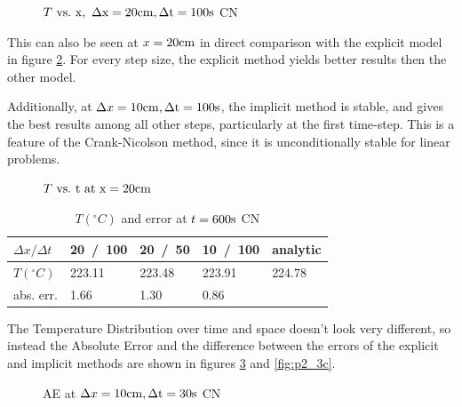 \documentclass[a4paper]{article} %
\begin{document}
\begin{multicols}{2}
\begin{figure}[H]
    
    \caption{$T\ \rm{vs.}\ x,\ \Delta x = 20\rm{cm}, \Delta t = 100\rm{s}$ CN}
    \label{fig:p2_1}
\end{figure}

This can also be seen at $x=20\rm{cm}$ in direct comparison with the explicit model in figure \ref{fig:p2_2}. For every step size, the explicit method yields better results then the other model.

Additionally, at $\Delta x = 10\rm{cm}, \Delta t = 100\rm{s}$, the implicit method is stable, and gives the best results among all other steps, particularly at the first time-step. This is a feature of the Crank-Nicolson method, since it is unconditionally stable for linear problems.


\begin{figure}[H]
    
    \caption{$T\ \rm{vs.}\ t \text{ at } x = 20\rm{cm}$}
    \label{fig:p2_2}
\end{figure}

\begin{table}[H]
\centering
\small
\begin{tabular}{ |p{1.2cm}||p{1.2cm}|p{1.2cm}|p{1.2cm}|p{1.1cm}| }
 \hline
 \rowcolor{gray!50}
 $\Delta x / \Delta t$ & 20\ /\ 100 & 20\ /\ 50 & 10\ /\ 100 & analytic \\
 \hline 
 \cellcolor{gray!25} $T (^\circ C)$ & 223.11 & 223.48 & 223.91 & 224.78 \\
 \hline
 \cellcolor{gray!25} abs. err. & 1.66 & 1.30 & 0.86 & \\
 \hline
\end{tabular}
\caption{$T (^\circ C)$ and error at $t=600\rm{s}$ CN}
\label{table:2}
\end{table}

\columnbreak

The Temperature Distribution over time and space doesn't look very different, so instead the Absolute Error and the difference between the errors of the explicit and implicit methods are shown in figures \ref{fig:p2_3b} and \ref{fig:p2_3c}.    

\begin{figure}[H]
    
    \caption{AE at $\Delta x = 10\rm{cm}, \Delta t = 30\rm{s}$ CN}
    \label{fig:p2_3b}
\end{figure}


\end{multicols}
\end{document}
